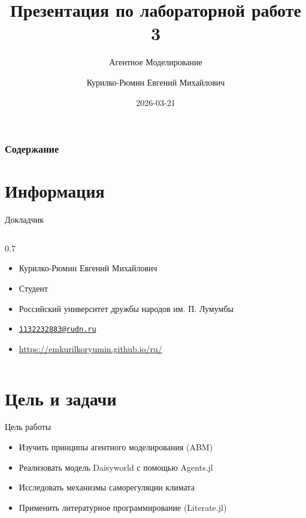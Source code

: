 \documentclass[
  ignorenonframetext,
  aspectratio=169,
  russian,
]{beamer}
\title{Презентация по лабораторной работе 3}
\subtitle{Агентное Моделирование}
\author{Курилко-Рюмин Евгений Михайлович}
\date{2026-03-21}
\providecommand{\tightlist}{%
  \setlength{\itemsep}{0pt}\setlength{\parskip}{0pt}}\usepackage{longtable,booktabs,array}
\renewcommand*\contentsname{Содержание}
\newcommand\contentsname{Содержание}
\begin{document}
\frame{\titlepage}

\renewcommand*\contentsname{Содержание}
\begin{frame}[allowframebreaks]
  \frametitle{Содержание}
  \setcounter{tocdepth}{3}
  \tableofcontents
\end{frame}

\section{Информация}\label{ux438ux43dux444ux43eux440ux43cux430ux446ux438ux44f}

\begin{frame}{Докладчик}
\label{ux434ux43eux43aux43bux430ux434ux447ux438ux43a}
\begin{columns}[c]
\begin{column}{0.7\linewidth}
\begin{itemize}
\tightlist
\item
  Курилко-Рюмин Евгений Михайлович
\item
  Студент
\item
  Российский университет дружбы народов им. П. Лумумбы
\item
  \href{mailto:1132232883@rudn.ru}{\nolinkurl{1132232883@rudn.ru}}
\item
  \url{https://emkurilkoryumin.github.io/ru/}
\end{itemize}
\end{column}
\end{columns}
\end{frame}

\section{Цель и
задачи}\label{ux446ux435ux43bux44c-ux438-ux437ux430ux434ux430ux447ux438}

\begin{frame}{Цель работы}
\label{ux446ux435ux43bux44c-ux440ux430ux431ux43eux442ux44b}
\begin{itemize}
\tightlist
\item
  Изучить принципы агентного моделирования (ABM)
\item
  Реализовать модель Daisyworld с помощью Agents.jl
\item
  Исследовать механизмы саморегуляции климата
\item
  Применить литературное программирование (Literate.jl)
\end{itemize}
\end{frame}
\end{document}
